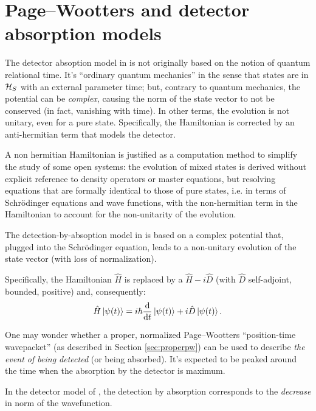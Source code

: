 \section{Page--Wootters and detector absorption models}\label{sec:absorption+pw}

The detector absoption model in \cite{RuschhauptAbsorption} is not originally
based on the notion of quantum relational time. It's ``ordinary quantum mechanics''
in the sense that states are in $\mathcal{H}_S$ with an external parameter time;
but, contrary to quantum mechanics, the potential can be \emph{complex},
causing the norm of the state vector to not be conserved (in fact, vanishing with time).
In other terms, the evolution is not unitary, even for a pure state.
Specifically, the Hamiltonian is corrected by an anti-hermitian term
that models the detector.

A non hermitian Hamiltonian is justified as a computation method
to simplify the study of some open systems: the evolution of mixed
states is derived without explicit reference to density operators
or master equations, but resolving equations that are formally
identical to those of pure states,
i.e. in terms of
Schr{\"o}dinger equations and wave functions,
with the non-hermitian term in the Hamiltonian
to account for the non-unitarity of the evolution.

The detection-by-absoption model in \cite{RuschhauptAbsorption}
is based on a complex potential that, plugged into the Schr\"odinger equation,
leads to a non-unitary evolution of the state vector
(with loss of normalization).

Specifically, the Hamiltonian $\hat{H}$ is replaced by a $\hat{H} - i\hat{D}$
(with $\hat{D}$ self-adjoint, bounded, positive)
and, consequently:
\begin{equation}\label{eq:schrod_complex_pot}
  \hat{H} \ket{\psi(t)} = i\hbar\dv{t}\ket{\psi(t)} +i\hat{D}\ket{\psi(t)} \text{.}
\end{equation}

One may wonder whether a proper, normalized Page--Wootters ``position-time wavepacket''
(as described in Section \ref{sec:properpw})
can be used to describe \emph{the event of being detected} (or being absorbed).
It's expected to be peaked around the time when the absorption by the detector is maximum.

\citereset
In the detector model of \cite{RuschhauptAbsorption}, the detection
by absorption
corresponds to the \emph{decrease} in norm of the wavefunction.

